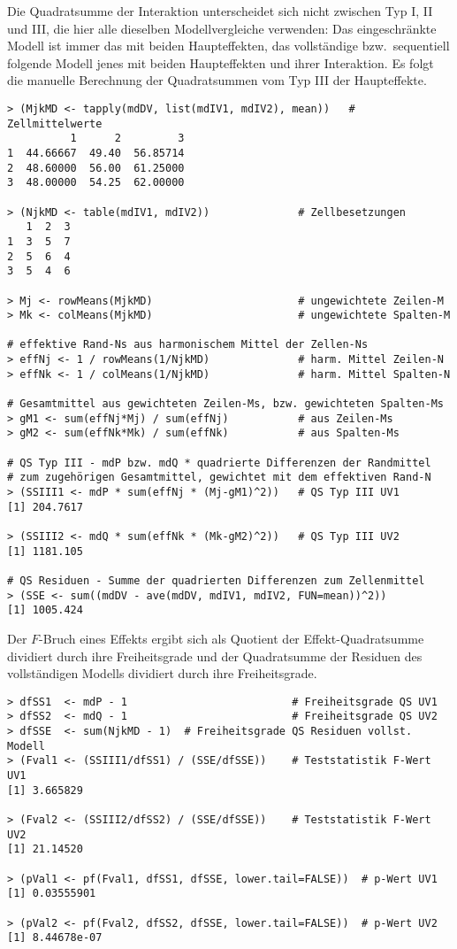 Die Quadratsumme der Interaktion unterscheidet sich nicht zwischen Typ I, II und III, die hier alle dieselben Modellvergleiche verwenden: Das eingeschränkte Modell ist immer das mit beiden Haupteffekten, das vollständige bzw.\ sequentiell folgende Modell jenes mit beiden Haupteffekten und ihrer Interaktion. Es folgt die manuelle Berechnung der Quadratsummen vom Typ III der Haupteffekte.
\begin{lstlisting}
> (MjkMD <- tapply(mdDV, list(mdIV1, mdIV2), mean))   # Zellmittelwerte
          1      2         3
1  44.66667  49.40  56.85714
2  48.60000  56.00  61.25000
3  48.00000  54.25  62.00000

> (NjkMD <- table(mdIV1, mdIV2))              # Zellbesetzungen
   1  2  3
1  3  5  7
2  5  6  4
3  5  4  6

> Mj <- rowMeans(MjkMD)                       # ungewichtete Zeilen-M
> Mk <- colMeans(MjkMD)                       # ungewichtete Spalten-M

# effektive Rand-Ns aus harmonischem Mittel der Zellen-Ns
> effNj <- 1 / rowMeans(1/NjkMD)              # harm. Mittel Zeilen-N
> effNk <- 1 / colMeans(1/NjkMD)              # harm. Mittel Spalten-N

# Gesamtmittel aus gewichteten Zeilen-Ms, bzw. gewichteten Spalten-Ms
> gM1 <- sum(effNj*Mj) / sum(effNj)           # aus Zeilen-Ms
> gM2 <- sum(effNk*Mk) / sum(effNk)           # aus Spalten-Ms

# QS Typ III - mdP bzw. mdQ * quadrierte Differenzen der Randmittel
# zum zugehörigen Gesamtmittel, gewichtet mit dem effektiven Rand-N
> (SSIII1 <- mdP * sum(effNj * (Mj-gM1)^2))   # QS Typ III UV1
[1] 204.7617

> (SSIII2 <- mdQ * sum(effNk * (Mk-gM2)^2))   # QS Typ III UV2
[1] 1181.105

# QS Residuen - Summe der quadrierten Differenzen zum Zellenmittel
> (SSE <- sum((mdDV - ave(mdDV, mdIV1, mdIV2, FUN=mean))^2))
[1] 1005.424
\end{lstlisting}

Der $F$-Bruch eines Effekts ergibt sich als Quotient der Effekt-Quadratsumme dividiert durch ihre Freiheitsgrade und der Quadratsumme der Residuen des vollständigen Modells dividiert durch ihre Freiheitsgrade.
\begin{lstlisting}
> dfSS1  <- mdP - 1                          # Freiheitsgrade QS UV1
> dfSS2  <- mdQ - 1                          # Freiheitsgrade QS UV2
> dfSSE  <- sum(NjkMD - 1)  # Freiheitsgrade QS Residuen vollst. Modell
> (Fval1 <- (SSIII1/dfSS1) / (SSE/dfSSE))    # Teststatistik F-Wert UV1
[1] 3.665829

> (Fval2 <- (SSIII2/dfSS2) / (SSE/dfSSE))    # Teststatistik F-Wert UV2
[1] 21.14520

> (pVal1 <- pf(Fval1, dfSS1, dfSSE, lower.tail=FALSE))  # p-Wert UV1
[1] 0.03555901

> (pVal2 <- pf(Fval2, dfSS2, dfSSE, lower.tail=FALSE))  # p-Wert UV2
[1] 8.44678e-07
\end{lstlisting}

